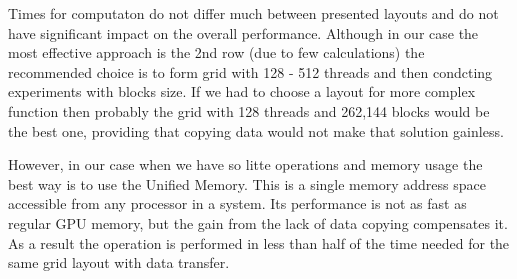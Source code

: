 \documentclass[12pt]{article}
\begin{document}
Times for computaton do not differ much between presented layouts and do not have significant impact on the overall performance. Although in our case the most effective approach is the 2nd row (due to few calculations) the recommended choice is to form grid with 128 - 512 threads and then condcting experiments with blocks size. If we had to choose a layout for more complex function then probably the grid with 128 threads and 262,144 blocks would be the best one, providing that copying data would not make that solution gainless.

However, in our case when we have so litte operations and memory usage the best way is to use the Unified Memory. This is a single memory address space accessible from any processor in a system. Its performance is not as fast as regular GPU memory, but the gain from the lack of data copying compensates it. As a result the operation is performed in less than half of the time needed for the same grid layout with data transfer.
\end{document}
